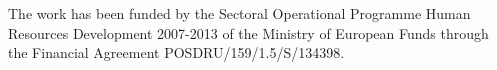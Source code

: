 The work has been funded by the Sectoral Operational Programme Human Resources Development 2007-2013 of the Ministry of European Funds through the Financial Agreement POSDRU/159/1.5/S/134398.

